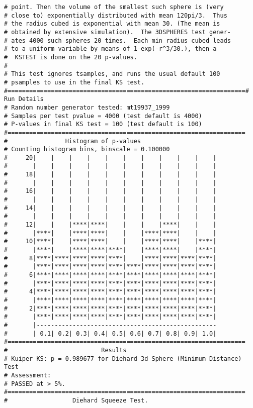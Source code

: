 \documentclass[12pt]{article}
\begin{document}
\begin{verbatim}
# point. Then the volume of the smallest such sphere is (very   
# close to) exponentially distributed with mean 120pi/3.  Thus  
# the radius cubed is exponential with mean 30. (The mean is    
# obtained by extensive simulation).  The 3DSPHERES test gener- 
# ates 4000 such spheres 20 times.  Each min radius cubed leads 
# to a uniform variable by means of 1-exp(-r^3/30.), then a     
#  KSTEST is done on the 20 p-values.                           
#
# This test ignores tsamples, and runs the usual default 100
# psamples to use in the final KS test.
#==================================================================#                        Run Details
# Random number generator tested: mt19937_1999
# Samples per test pvalue = 4000 (test default is 4000)
# P-values in final KS test = 100 (test default is 100)
#==================================================================
#                Histogram of p-values
# Counting histogram bins, binscale = 0.100000
#     20|    |    |    |    |    |    |    |    |    |    |
#       |    |    |    |    |    |    |    |    |    |    |
#     18|    |    |    |    |    |    |    |    |    |    |
#       |    |    |    |    |    |    |    |    |    |    |
#     16|    |    |    |    |    |    |    |    |    |    |
#       |    |    |    |    |    |    |    |    |    |    |
#     14|    |    |    |    |    |    |    |    |    |    |
#       |    |    |    |    |    |    |    |    |    |    |
#     12|    |    |****|****|    |    |    |****|    |    |
#       |****|    |****|****|    |    |****|****|    |    |
#     10|****|    |****|****|    |    |****|****|    |****|
#       |****|    |****|****|****|    |****|****|    |****|
#      8|****|****|****|****|****|    |****|****|****|****|
#       |****|****|****|****|****|****|****|****|****|****|
#      6|****|****|****|****|****|****|****|****|****|****|
#       |****|****|****|****|****|****|****|****|****|****|
#      4|****|****|****|****|****|****|****|****|****|****|
#       |****|****|****|****|****|****|****|****|****|****|
#      2|****|****|****|****|****|****|****|****|****|****|
#       |****|****|****|****|****|****|****|****|****|****|
#       |--------------------------------------------------
#       | 0.1| 0.2| 0.3| 0.4| 0.5| 0.6| 0.7| 0.8| 0.9| 1.0|
#==================================================================
#                          Results
# Kuiper KS: p = 0.989677 for Diehard 3d Sphere (Minimum Distance) Test
# Assessment:
# PASSED at > 5%.
#==================================================================
#                  Diehard Squeeze Test.

\end{verbatim}
\end{document}
